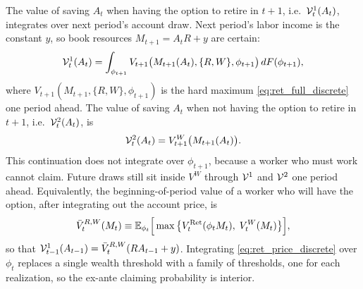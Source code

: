 The value of saving $A_t$ when having the option to retire in $t + 1$, i.e.\ $\mathcal{V}_t^1(A_t)$,
integrates over next period's account draw. Next period's labor income is the constant $y$,
so book resources $M_{t+1} = A_t R + y$ are certain:
\begin{equation}
\mathcal{V}_t^1(A_t) = \int_{\phi_{t+1}}
V_{t+1}\bigl(M_{t+1}(A_t), \{R, W\}, \phi_{t+1}\bigr)\, dF(\phi_{t+1}),
\label{eq:ret_full_gothV1}
\end{equation}
where
$V_{t+1}(M_{t+1}, \{R, W\}, \phi_{t+1})$ is the hard maximum \eqref{eq:ret_full_discrete} one
period ahead. The value of saving $A_t$ when not having the option to
retire in $t + 1$, i.e.\ $\mathcal{V}_t^2(A_t)$, is
\begin{equation}
\mathcal{V}_t^2(A_t) = V_{t+1}^{W}\bigl(M_{t+1}(A_t)\bigr).
\label{eq:ret_full_gothV2}
\end{equation}
This continuation does not integrate over $\phi_{t+1}$, because a worker who must work
cannot claim. Future draws still sit inside $V^{W}$ through $\mathcal{V}^{1}$ and $\mathcal{V}^{2}$ one
period ahead. Equivalently, the beginning-of-period value of a worker who will have the
option, after integrating out the account price, is
\begin{align}
	\bar V_t^{R,W}(M_t)
	\equiv \mathbb{E}_{\phi_t}\Big[
		\max\big\{
			V_t^{\mathrm{Ret}}(\phi_t M_t),\;
			V_t^{W}(M_t)
		\big\}
	\Big],
	\label{eq:ret_full_barVRW}
\end{align}
so that $\mathcal{V}_{t-1}^{1}(A_{t-1}) = \bar V_t^{R,W}(R A_{t-1} + y)$. Integrating
\eqref{eq:ret_price_discrete} over $\phi_t$ replaces a single wealth threshold with a family of
thresholds, one for each realization, so the ex-ante claiming probability is interior.

